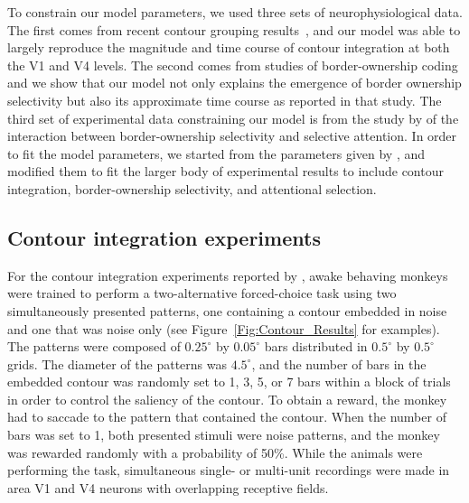 To constrain our model parameters, we used three sets of
neurophysiological data. The first comes from recent contour grouping
results~\citep{Chen_etal14}, and our model was able to largely
reproduce the magnitude and time course of contour integration at both
the V1 and V4 levels. The second comes from studies of border-ownership coding
\citep{Zhou_etal00} and we show that our model not only explains the
emergence of border ownership selectivity but also its approximate
time course as reported in that study. The third set of experimental data
constraining our model is from the study by \cite{Qiu_etal07} of the
interaction between border-ownership selectivity and selective
attention. In order to fit the model
parameters, we started from the parameters given by
\cite{Mihalas_etal11b}, and modified them to fit the larger body of
experimental results to include contour integration, border-ownership
selectivity, and attentional selection.

\subsection{Contour integration experiments} 
\label{sec:contour_exp}
For the contour integration experiments reported by
\cite{Chen_etal14}, awake behaving monkeys were trained to perform a
two-alternative forced-choice task using two simultaneously presented
patterns, one containing a contour embedded in noise and one that was
noise only (see Figure~\ref{Fig:Contour_Results} for examples).  The
patterns were composed of $0.25^{\circ}$ by $0.05^{\circ}$ bars
distributed in $0.5^{\circ}$ by $0.5^{\circ}$ grids.  The diameter of
the patterns was $4.5^{\circ}$, and the number of bars in the embedded
contour was randomly set to 1, 3, 5, or 7 bars within a block of
trials in order to control the saliency of the contour.  To obtain a
reward, the monkey had to saccade to the pattern that contained the
contour. When the number of bars was set to 1, both presented
stimuli were noise patterns, and the monkey was rewarded 
randomly with a probability of 50\%.  While the animals were performing the task,
simultaneous single- or multi-unit recordings were made in area V1 and
V4 neurons with overlapping receptive fields.


